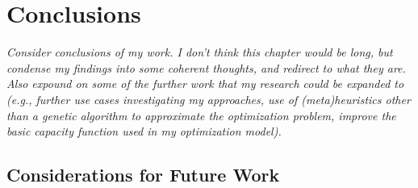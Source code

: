 \documentclass[12pt,dvipsnames]{report}
\begin{document}
\fi

\iftrue
\pagebreak
\chapter{Conclusions} \label{ch:conc}

%
\textit{Consider conclusions of my work.  I don't think this chapter would be long, but condense my findings into some coherent thoughts, and redirect to what they are.  Also expound on some of the further work that my research could be expanded to (e.g., further use cases investigating my approaches, use of (meta)heuristics other than a genetic algorithm to approximate the optimization problem, improve the basic capacity function used in my optimization model).}

\section{Considerations for Future Work} \label{sec:futurework}

\end{document}
